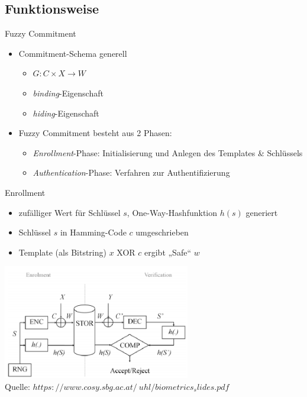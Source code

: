 \documentclass{beamer}
\begin{document}
\subsection{Funktionsweise}
\begin{frame}{Fuzzy Commitment}
	\begin{itemize}
		\item Commitment-Schema generell
		\begin{itemize}
			\item $G : C\times X \rightarrow W$
			\item \textit{binding}-Eigenschaft
			\item \textit{hiding}-Eigenschaft
		\end{itemize}
		\item Fuzzy Commitment besteht aus 2 Phasen:
		\begin{itemize}
			\item \textit{Enrollment}-Phase: Initialisierung und Anlegen des Templates \& Schl\"ussels
			\item \textit{Authentication}-Phase: Verfahren zur Authentifizierung 
		\end{itemize}
	\end{itemize}
\end{frame}
\begin{frame}{Enrollment}
	\begin{itemize}
		\item zuf\"alliger Wert f\"ur Schl\"ussel $s$, One-Way-Hashfunktion $h(s)$ generiert
		\item Schl\"ussel $s$ in Hamming-Code $c$ umgeschrieben
		\item Template (als Bitstring) $x$ XOR $c$ ergibt „Safe“ $w$
	\end{itemize}
	\hspace{10mm}\includegraphics[height=5cm]{fcs.png}\\
	\tiny{Quelle: \textit{\tiny{$https://www.cosy.sbg.ac.at/~uhl/biometrics_slides.pdf$}}}
\end{frame}
\end{document}
